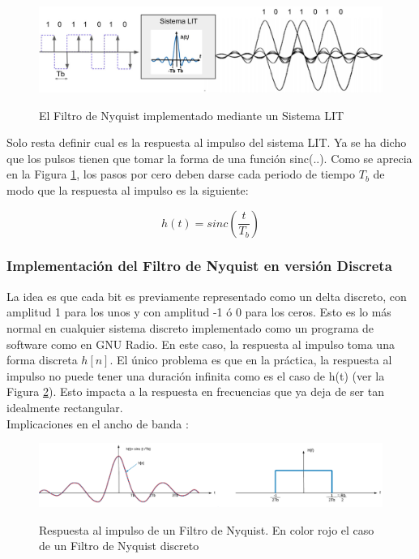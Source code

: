 \begin{figure}[h!]
	\captionsetup{justification = raggedright, singlelinecheck = false}
	\caption{El Filtro de Nyquist implementado mediante un Sistema LIT} 
	\centering
	\includegraphics[scale=0.3]{Imagenes/filtro_nyquist.jpg}
	\label{fig:Secuencia}
\end{figure}

Solo resta definir cual es la respuesta al impulso del sistema LIT. Ya se ha dicho que los pulsos tienen que tomar la forma de una función sinc(..). Como se aprecia en la Figura  \ref{fig:Secuencia}, los pasos por cero deben darse cada periodo de tiempo $T_b$ de modo que la respuesta al impulso es la siguiente:

\begin{equation} \label{capcuatro_trece}
	 h(t) = sinc(\dfrac{t}{T_{b}}) 
\end{equation}

\subsubsection{Implementación del Filtro de Nyquist en versión Discreta}
La idea es que cada bit es previamente representado como un delta discreto, con amplitud 1 para los unos y con amplitud -1 ó 0 para los ceros. Esto es lo más normal en cualquier sistema discreto implementado como un programa de software como en GNU Radio. En este caso, la respuesta al impulso toma una forma discreta $h[n]$. El único problema es que en la práctica, la respuesta al impulso no puede tener una duración infinita como es el caso de h(t) (ver la Figura \ref{fig:Eme}). Esto impacta a la respuesta en frecuencias que ya deja de ser tan idealmente rectangular.  \\

Implicaciones en el ancho de banda :

\vspace{200px}
\begin{figure}[h!]
	\captionsetup{justification = raggedright, singlelinecheck = false}
	\caption{Respuesta al impulso de un Filtro de Nyquist. En color rojo el caso de un Filtro de Nyquist discreto} 
	\centering
	\includegraphics[scale=0.5]{Imagenes/Eme.png}
	\label{fig:Eme}
\end{figure}

